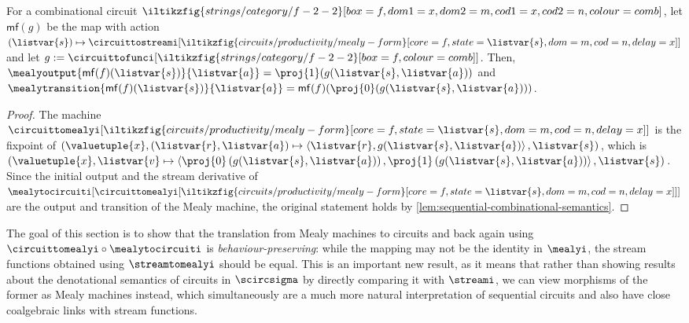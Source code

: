 \begin{proposition}
    \label{prop:mealy-form-image}
    For a combinational circuit \(
    \iltikzfig{strings/category/f-2-2}[box=f,dom1=x,dom2=m,cod1=x,cod2=n,colour=comb]
    \), let \(\mathsf{mf}(g)\) be the map with action \(
    (\listvar{s}) \mapsto
    \circuittostreami[
        \iltikzfig{circuits/productivity/mealy-form}[core=f,state=\listvar{s},dom=m,cod=n,delay=x]
    ]
    \) and let \(
    g
    :=
    \circuittofunci[
        \iltikzfig{strings/category/f-2-2}[box=f,colour=comb]
    ]
    \).
    Then, \(
    \mealyoutput{\mathsf{mf}(f)(\listvar{s})}{\listvar{a}}
    =
    \proj{1}(g(\listvar{s}, \listvar{a}))
    \) and \(
    \mealytransition{\mathsf{mf}(f)(\listvar{s})}{\listvar{a}}
    =
    \mathsf{mf}(f)(\proj{0}(g(\listvar{s}, \listvar{a})))
    \).
\end{proposition}
\begin{proof}
    The machine \(\circuittomealyi[
        \iltikzfig{circuits/productivity/mealy-form}[core=f,state=\listvar{s},dom=m,cod=n,delay=x]
    ]\) is the fixpoint of \(
    \left(\valuetuple{x},
    (\listvar{r}, \listvar{a}) \mapsto \left\langle
    \listvar{r}, g(\listvar{s}, \listvar{a})
    \right\rangle, \listvar{s}\right)
    \), which is \(
    \left(\valuetuple{x},
    \listvar{v} \mapsto \left\langle
    \proj{0}\left(g(\listvar{s},\listvar{a})\right),
    \proj{1}\left(g(\listvar{s}, \listvar{a})\right)
    \right\rangle, \listvar{s}\right)
    \).
    Since the initial output and the stream derivative of \(
    \mealytocircuiti[
        \circuittomealyi[
            \iltikzfig{circuits/productivity/mealy-form}[core=f,state=\listvar{s},dom=m,cod=n,delay=x]
        ]
    ]
    \) are the output and transition of the Mealy machine, the original
    statement holds by \cref{lem:sequential-combinational-semantics}.
\end{proof}

The goal of this section is to show that the translation from Mealy machines to
circuits and back again using \(\circuittomealyi \circ \mealytocircuiti\) is
\emph{behaviour-preserving}: while the mapping may not be the identity in
\(\mealyi\), the stream functions obtained using \(\streamtomealyi\) should
be equal.
This is an important new result, as it means that rather than showing
results about the denotational semantics of circuits in \(\scircsigma\) by
directly comparing it with \(\streami\), we can view morphisms of the former as
Mealy machines instead, which simultaneously are a much more natural
interpretation of sequential circuits and also have close coalgebraic links with
stream functions.

